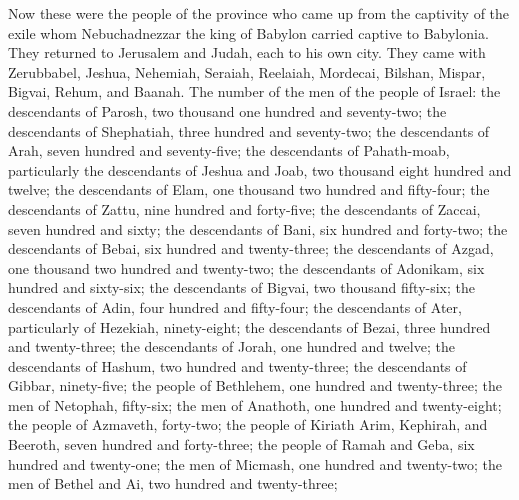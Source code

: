 \begin{biblechapter} %
 Now these were the people of the province who came up from the captivity of the exile whom Nebuchadnezzar the king of Babylon carried captive to Babylonia. They returned to Jerusalem and Judah, each to his own city.
\verse They came with Zerubbabel, Jeshua, Nehemiah, Seraiah, Reelaiah, Mordecai, Bilshan, Mispar, Bigvai, Rehum, and Baanah.
\verse The number of the men of the people of Israel:
\verse the descendants of Parosh, two thousand one hundred and seventy-two;
\verse the descendants of Shephatiah, three hundred and seventy-two;
\verse the descendants of Arah, seven hundred and seventy-five;
\verse the descendants of Pahath-moab, particularly the descendants of Jeshua and Joab, two thousand eight hundred and twelve;
\verse the descendants of Elam, one thousand two hundred and fifty-four;
\verse the descendants of Zattu, nine hundred and forty-five;
\verse the descendants of Zaccai, seven hundred and sixty;
\verse the descendants of Bani, six hundred and forty-two;
\verse the descendants of Bebai, six hundred and twenty-three;
\verse the descendants of Azgad, one thousand two hundred and twenty-two;
\verse the descendants of Adonikam, six hundred and sixty-six;
\verse the descendants of Bigvai, two thousand fifty-six;
\verse the descendants of Adin, four hundred and fifty-four;
\verse the descendants of Ater, particularly of Hezekiah, ninety-eight;
\verse the descendants of Bezai, three hundred and twenty-three;
\verse the descendants of Jorah, one hundred and twelve;
\verse the descendants of Hashum, two hundred and twenty-three;
\verse the descendants of Gibbar, ninety-five;
\verse the people of Bethlehem, one hundred and twenty-three;
\verse the men of Netophah, fifty-six;
\verse the men of Anathoth, one hundred and twenty-eight;
\verse the people of Azmaveth, forty-two;
\verse the people of Kiriath Αrim, Kephirah, and Beeroth, seven hundred and forty-three;
\verse the people of Ramah and Geba, six hundred and twenty-one;
\verse the men of Micmash, one hundred and twenty-two;
\verse the men of Bethel and Ai, two hundred and twenty-three;

\end{biblechapter}
